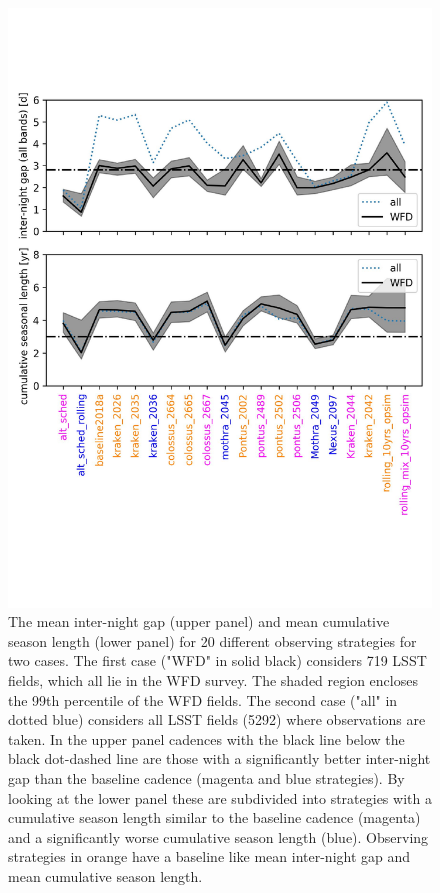 \begin{figure}
\centering
\includegraphics[scale=0.6]{figures/sl_cadences.pdf}
\caption{The mean inter-night gap (upper panel) and mean cumulative season length (lower panel) for 20 different observing strategies for two cases. The first case ("WFD" in solid black) considers 719 LSST fields, which all lie in the WFD survey. The shaded region encloses the 99th percentile of the WFD fields. The second case ("all" in dotted blue) considers all LSST fields (5292) where observations are taken. In the upper panel cadences with the black line below the black dot-dashed line are those with a significantly better inter-night gap than the baseline cadence (magenta and blue strategies). By looking at the lower panel these are subdivided into strategies with a cumulative season length similar to the baseline cadence (magenta) and a significantly worse cumulative season length (blue). Observing strategies in orange have a baseline like mean inter-night gap and mean cumulative season length.}
\label{fig:cadences categories}
\end{figure}


